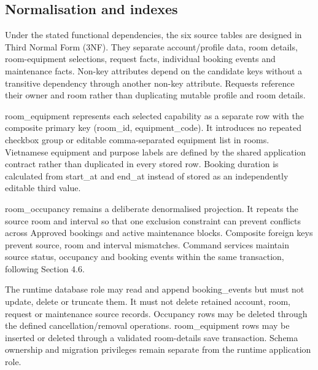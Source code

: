 \vspace{2mm}

\subsection{Normalisation and indexes}

Under the stated functional dependencies, the six source tables are designed in Third Normal Form (3NF). They separate account/\allowbreak{}profile data, room details, room-equipment selections, request facts, individual booking events and maintenance facts. Non-key attributes depend on the candidate keys without a transitive dependency through another non-key attribute. Requests reference their owner and room rather than duplicating mutable profile and room details.\par

room\allowbreak\_\allowbreak{}equipment represents each selected capability as a separate row with the composite primary key (room\allowbreak\_\allowbreak{}id, equipment\allowbreak\_\allowbreak{}code). It introduces no repeated checkbox group or editable comma-separated equipment list in rooms. Vietnamese equipment and purpose labels are defined by the shared application contract rather than duplicated in every stored row. Booking duration is calculated from start\allowbreak\_\allowbreak{}at and end\allowbreak\_\allowbreak{}at instead of stored as an independently editable third value.\par

room\allowbreak\_\allowbreak{}occupancy remains a deliberate denormalised projection. It repeats the source room and interval so that one exclusion constraint can prevent conflicts across Approved bookings and active maintenance blocks. Composite foreign keys prevent source, room and interval mismatches. Command services maintain source status, occupancy and booking events within the same transaction, following Section 4.6.\par

The runtime database role may read and append booking\allowbreak\_\allowbreak{}events but must not update, delete or truncate them. It must not delete retained account, room, request or maintenance source records. Occupancy rows may be deleted through the defined cancellation/\allowbreak{}removal operations. room\allowbreak\_\allowbreak{}equipment rows may be inserted or deleted through a validated room-details save transaction. Schema ownership and migration privileges remain separate from the runtime application role.\par

